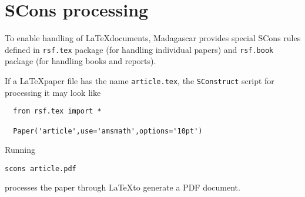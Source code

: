 \section{SCons processing}

To enable handling of \LaTeX documents, Madagascar provides special
SCons rules defined in \texttt{rsf.tex} package (for handling
individual papers) and \texttt{rsf.book} package (for handling books
and reports).

If a \LaTeX paper file has the name
\texttt{article.tex}, the \texttt{SConstruct} script for processing it
may look like
\lstset{language=python,showstringspaces=false,frame=single}
\begin{lstlisting}
  from rsf.tex import *

  Paper('article',use='amsmath',options='10pt')
\end{lstlisting}
Running
\begin{verbatim}
scons article.pdf
\end{verbatim}
processes the paper through \LaTeX to generate a PDF document.

